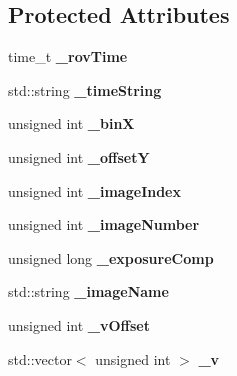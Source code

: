 \subsection*{Protected Attributes}
\begin{DoxyCompactItemize}
\item 
time\+\_\+t {\bfseries \+\_\+rov\+Time}\hypertarget{classLaserData_a2140cf25b9ac7ce20d6b540b20b99a7d}{}\label{classLaserData_a2140cf25b9ac7ce20d6b540b20b99a7d}

\item 
std\+::string {\bfseries \+\_\+time\+String}\hypertarget{classLaserData_aa45614462c6491caeeadb65943cbadd0}{}\label{classLaserData_aa45614462c6491caeeadb65943cbadd0}

\item 
unsigned int {\bfseries \+\_\+binX}\hypertarget{classLaserData_abb35aa1f1efc0dfac118b88089486edb}{}\label{classLaserData_abb35aa1f1efc0dfac118b88089486edb}

\item 
unsigned int {\bfseries \+\_\+offsetY}\hypertarget{classLaserData_a75e194db9bceaf11c08843ff80447fb1}{}\label{classLaserData_a75e194db9bceaf11c08843ff80447fb1}

\item 
unsigned int {\bfseries \+\_\+image\+Index}\hypertarget{classLaserData_ab05d3192dd1f9ff1c5c78a7615327c1f}{}\label{classLaserData_ab05d3192dd1f9ff1c5c78a7615327c1f}

\item 
unsigned int {\bfseries \+\_\+image\+Number}\hypertarget{classLaserData_af07e17529f55ccfedea786ce8ef0a07a}{}\label{classLaserData_af07e17529f55ccfedea786ce8ef0a07a}

\item 
unsigned long {\bfseries \+\_\+exposure\+Comp}\hypertarget{classLaserData_ac4c27dd390b8ba11b56fecaf5d8ffa3b}{}\label{classLaserData_ac4c27dd390b8ba11b56fecaf5d8ffa3b}

\item 
std\+::string {\bfseries \+\_\+image\+Name}\hypertarget{classLaserData_a4ecb08474180bc17d48c0a95c51ab1de}{}\label{classLaserData_a4ecb08474180bc17d48c0a95c51ab1de}

\item 
unsigned int {\bfseries \+\_\+v\+Offset}\hypertarget{classLaserData_a5c84579061d71307a242d75b35b2044f}{}\label{classLaserData_a5c84579061d71307a242d75b35b2044f}

\item 
std\+::vector$<$ unsigned int $>$ {\bfseries \+\_\+v}\hypertarget{classLaserData_a5c4ebb33fe698835a96816942c513eed}{}\label{classLaserData_a5c4ebb33fe698835a96816942c513eed}


\end{DoxyCompactItemize}

